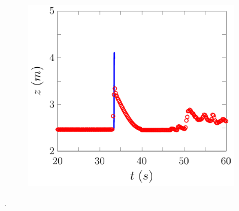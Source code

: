 \begin{figure}
\begin{subfigure}{0.5\textwidth}
		\vspace{0.5cm}
	\end{subfigure}
	\begin{subfigure}{0.5\textwidth}
		\includegraphics[width=\textwidth]{./chp6/figures/Experiment/Roeber/Trial8/FDVM/WG9-figure0.pdf}
		\vspace{0.5cm}
	\end{subfigure}%
	\caption{.}
	\label{fig:Roeber8WG7to9DEVM}
\end{figure}
